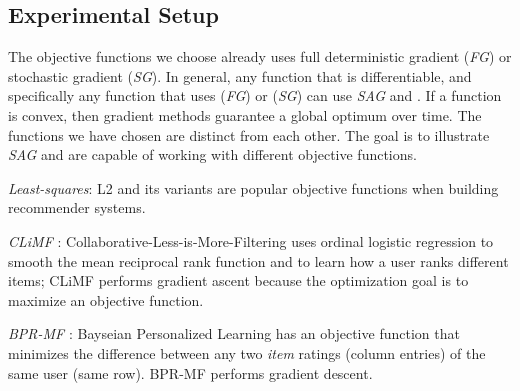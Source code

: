 \subsection{Experimental Setup}

The objective functions we choose already uses full deterministic gradient (\emph{FG}) or stochastic gradient (\emph{SG}).  
In general, any function that is differentiable, and specifically any function that uses (\emph{FG}) or (\emph{SG}) can use \emph{SAG} and \tool.
If a function is convex, then gradient methods guarantee a global optimum over time.
The functions we have chosen are distinct from each other.  The goal is to illustrate \emph{SAG} and \tool are capable of working with different objective functions.
\begin{sloppy}
\begin{compactenum}
\item \emph{Least-squares}: L2 and its variants \cite{mnar, wrmf2008hu, wrmf2008pan} are popular objective functions when building recommender systems.
\item \emph{CLiMF} \cite{climf}: Collaborative-Less-is-More-Filtering uses ordinal logistic regression to smooth the mean reciprocal rank function and to learn how a user ranks different items; 
CLiMF performs gradient ascent because the optimization goal is to maximize an objective function.
\item \emph{BPR-MF} \cite{bpr}: Bayseian Personalized Learning has an objective function that minimizes 
the difference between any two \emph{item} ratings (column entries) of the same user (same row).
BPR-MF performs gradient descent.
\end{compactenum}
\end{sloppy}


